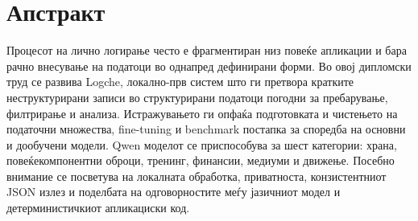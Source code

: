 \chapter*{Апстракт}

Процесот на лично логирање често е фрагментиран низ повеќе апликации и бара рачно внесување на податоци во однапред дефинирани форми.
Во овој дипломски труд се развива Logche, локално-прв систем што ги претвора кратките неструктурирани записи во структурирани податоци погодни за пребарување, филтрирање и анализа.
Истражувањето ги опфаќа подготовката и чистењето на податочни множества, fine-tuning и benchmark постапка за споредба на основни и дообучени модели.
Qwen моделот се приспособува за шест категории: храна, повеќекомпонентни оброци, тренинг, финансии, медиуми и движење.
Посебно внимание се посветува на локалната обработка, приватноста, конзистентниот JSON излез и поделбата на одговорностите меѓу јазичниот модел и детерминистичкиот апликациски код.
